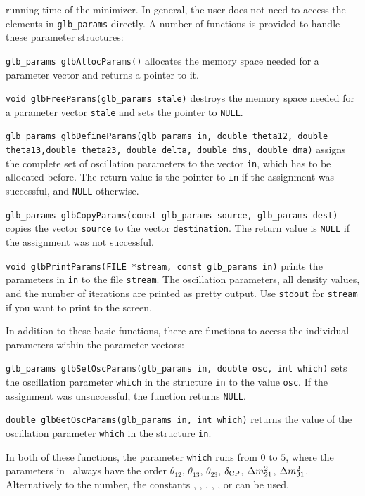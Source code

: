 running time of the minimizer. In general, the user does not need to
access the elements in {\tt glb\_params} directly. A number of functions
is provided to handle these parameter structures:
\begin{function}
{\tt glb\_params glbAllocParams()} allocates the memory space
needed for a parameter vector and returns a pointer to it.
\end{function}
\begin{function}
{\tt void glbFreeParams(glb\_params stale)} destroys the memory space
needed for a parameter vector {\tt stale} and sets the pointer to {\tt NULL}.
\end{function}
\begin{function}
{\tt glb\_params glbDefineParams(glb\_params in, double theta12, double theta13,double theta23, double delta, double dms, double dma)} assigns
the complete set of oscillation parameters to the vector {\tt in}, which has
to be allocated before. The return value is the pointer to {\tt in} if 
the assignment was successful, and {\tt NULL} otherwise.
\end{function}
\begin{function}
 {\tt glb\_params glbCopyParams(const glb\_params source, glb\_params dest)}
 copies the vector {\tt source} to the vector {\tt destination}. The return
 value is {\tt NULL} if the assignment was not successful.
\end{function}
\begin{function}
{\tt void glbPrintParams(FILE *stream, const glb\_params in)} prints the
parameters in {\tt in} to the file {\tt stream}. The oscillation
parameters, all density values, and the number of iterations are
printed as pretty output. Use {\tt stdout} for {\tt stream} if you want
to print to the screen.
\end{function}
In addition to these basic functions, there are functions to access
the individual parameters within the parameter vectors:
\begin{function}
{\tt glb\_params glbSetOscParams(glb\_params in, double osc, int which)}
sets the oscillation parameter {\tt which} in the structure {\tt in}
to the value {\tt osc}. If the assignment was unsuccessful, the 
function returns {\tt NULL}.
\end{function}
\begin{function}
{\tt double glbGetOscParams(glb\_params in, int which)}
returns the value of the oscillation parameter {\tt which} in the 
structure {\tt in}.
\end{function}
In both of these functions, the parameter {\tt which} runs from
$0$ to $5$, where the parameters in \GLOBES\ always have the order $\theta_{12}$, $\theta_{13}$, $\theta_{23}$, $\delta_{\mathrm{CP}}$, $\Delta m_{21}^2$, $\Delta m_{31}^2$.
Alternatively to the number, the constants , , , , 
, or  can be used.

